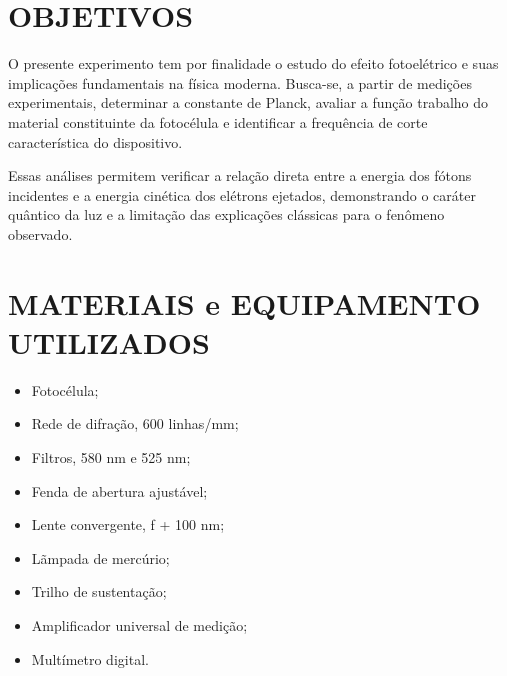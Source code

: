 \documentclass[10pt,twocolumn,letterpaper]{article}
\begin{document}

\section{OBJETIVOS}

\hspace{1cm} O presente experimento tem por finalidade o estudo do efeito fotoelétrico e suas implicações fundamentais na física moderna. Busca-se, a partir de medições experimentais, determinar a constante de Planck, avaliar a função trabalho do material constituinte da fotocélula e identificar a frequência de corte característica do dispositivo.

\hspace{1cm} Essas análises permitem verificar a relação direta entre a energia dos fótons incidentes e a energia cinética dos elétrons ejetados, demonstrando o caráter quântico da luz e a limitação das explicações clássicas para o fenômeno observado.


\section{MATERIAIS e EQUIPAMENTO UTILIZADOS}

\begin{itemize}
    \item Fotocélula;
    \item Rede de difração, 600 linhas/mm;
    \item Filtros, 580 nm e 525 nm;
    \item Fenda de abertura ajustável;
    \item Lente convergente, f + 100 nm;
    \item Lãmpada de mercúrio;
    \item Trilho de sustentação;
    \item Amplificador universal de medição;
    \item Multímetro digital.
\end{itemize}
\end{document}
